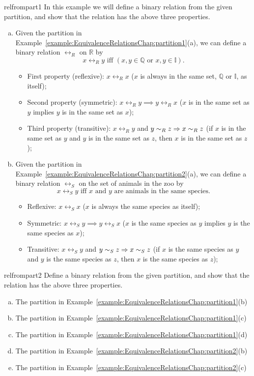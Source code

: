\begin{example}{relfrompart1}
In this example we will define a binary relation from the given partition, and show that the relation has the above three properties.
\begin{enumerate}[(a)]
\item Given the partition in Example~\ref{example:EquivalenceRelationsChap:partition1}(a), we can define a binary relation $\rel_R$ on $\mathbb{R}$ by 
\[x \rel_R y  \text{   iff   }  (x,y \in \mathbb{Q} \text{ or }x,y \in \mathbb{I}).\]

\begin{itemize}
\item  First property (reflexive): $x \rel_R x$ ($x$ is always in the same set, $\mathbb{Q}$ or $\mathbb{I}$, as itself);
\item  Second property (symmetric): $x \rel_R y \implies y \rel_R x$ ($x$ is in the same set as $y$ implies $y$ is in the same set as $x$);
\item  Third property (transitive): $x \rel_R y$ and $y \sim_R z \Rightarrow x \sim_R z$ (if $x$ is in the same set as $y$ and $y$ is in the same set as $z$, then $x$ is in the same set as $z$);
\end{itemize}

\item Given the partition in Example~\ref{example:EquivalenceRelationsChap:partition2}(a), we can define a binary relation $\rel_S$ on the set of animals in the zoo by 
\[x \rel_S y  \text{   iff   }  x \text{ and } y \text{ are animals in the same species} .\]
\begin{itemize}
\item  Reflexive: $x \rel_S x$ ($x$ is always the same species as itself);
\item  Symmetric: $x \rel_S y \implies y \rel_S x$ ($x$ is the same species as $y$ implies $y$ is the same species as $x$);
\item  Transitive: $x \rel_S y$ and $y \sim_S z \Rightarrow x \sim_S z$ (if $x$ is the same species as $y$ and $y$ is the same species as $z$, then $x$ is the same species as $z$);
\end{itemize}
\end{enumerate}
\end{example}

\begin{exercise}{relfrompart2}
Define a binary relation from the given partition, and show that the relation has the above three properties.
\begin{enumerate}[(a)]
\item The partition in Example~\ref{example:EquivalenceRelationsChap:partition1}(b)
\item The partition in Example~\ref{example:EquivalenceRelationsChap:partition1}(c)
\item The partition in Example~\ref{example:EquivalenceRelationsChap:partition1}(d)
\item The partition in Example~\ref{example:EquivalenceRelationsChap:partition2}(b)
\item The partition in Example~\ref{example:EquivalenceRelationsChap:partition2}(c)
\end{enumerate}
\end{exercise}

